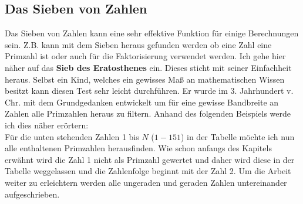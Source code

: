 \documentclass[german,12pt,a4paper]{article}
\begin{document}
\subsection{Das Sieben von Zahlen}
Das Sieben von Zahlen kann eine sehr effektive Funktion für einige Berechnungen sein. Z.B. kann mit dem Sieben heraus gefunden werden ob eine Zahl eine Primzahl ist oder auch für die Faktorisierung verwendet werden. Ich gehe hier näher auf das \textbf{Sieb des Eratosthenes} ein. Dieses sticht mit seiner Einfachheit heraus. Selbst ein Kind, welches ein gewisses Maß an mathematischen Wissen besitzt kann diesen Test sehr leicht durchführen. Er wurde im 3. Jahrhundert v. Chr. mit dem Grundgedanken entwickelt um für eine gewisse Bandbreite an Zahlen alle Primzahlen heraus zu filtern. Anhand des folgenden Beispiels werde ich dies näher erörtern:\\
Für die unten stehenden Zahlen 1 bis $N$ ($1-151$) in der Tabelle möchte ich nun alle enthaltenen Primzahlen herausfinden. Wie schon anfangs des Kapitels erwähnt wird die Zahl 1 nicht als Primzahl gewertet und daher wird diese in der Tabelle weggelassen und die Zahlenfolge beginnt mit der Zahl 2. Um die Arbeit weiter zu erleichtern werden alle ungeraden und geraden Zahlen untereinander aufgeschrieben.\\
\end{document}
